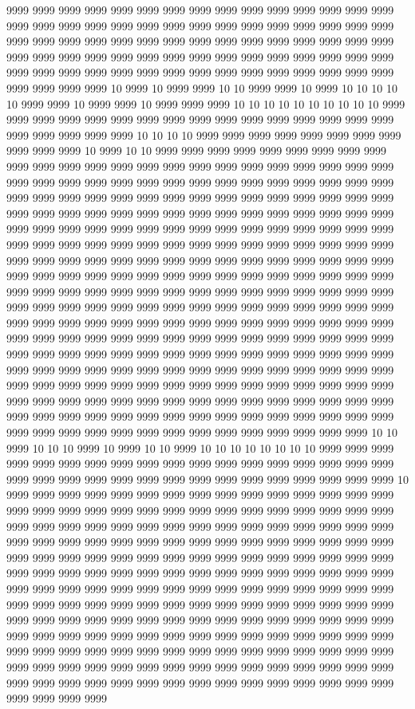 9999 9999 9999 9999 9999 9999 9999 9999 9999 9999 9999 9999 9999 9999 9999 9999 9999 9999 9999 9999 9999 9999 9999 9999 9999 9999 9999 9999 9999 9999 9999 9999 9999 9999 9999 9999 9999 9999 9999 9999 9999 9999 9999 9999 9999 9999 9999 9999 9999 9999 9999 9999 9999 9999 9999 9999 9999 9999 9999 9999 9999 9999 9999 9999 9999 9999 9999 9999 9999 9999 9999 9999 9999 9999 9999 9999 9999 9999 9999 10 9999 10 9999 9999 10 10 9999 9999 10 9999 10 10 10 10 10 9999 9999 10 9999 9999 10 9999 9999 9999 10 10 10 10 10 10 10 10 10 10 9999 9999 9999 9999 9999 9999 9999 9999 9999 9999 9999 9999 9999 9999 9999 9999 9999 9999 9999 9999 9999 10 10 10 10 9999 9999 9999 9999 9999 9999 9999 9999 9999 9999 9999 10 9999 10 10 9999 9999 9999 9999 9999 9999 9999 9999 9999 9999 9999 9999 9999 9999 9999 9999 9999 9999 9999 9999 9999 9999 9999 9999 9999 9999 9999 9999 9999 9999 9999 9999 9999 9999 9999 9999 9999 9999 9999 9999 9999 9999 9999 9999 9999 9999 9999 9999 9999 9999 9999 9999 9999 9999 9999 9999 9999 9999 9999 9999 9999 9999 9999 9999 9999 9999 9999 9999 9999 9999 9999 9999 9999 9999 9999 9999 9999 9999 9999 9999 9999 9999 9999 9999 9999 9999 9999 9999 9999 9999 9999 9999 9999 9999 9999 9999 9999 9999 9999 9999 9999 9999 9999 9999 9999 9999 9999 9999 9999 9999 9999 9999 9999 9999 9999 9999 9999 9999 9999 9999 9999 9999 9999 9999 9999 9999 9999 9999 9999 9999 9999 9999 9999 9999 9999 9999 9999 9999 9999 9999 9999 9999 9999 9999 9999 9999 9999 9999 9999 9999 9999 9999 9999 9999 9999 9999 9999 9999 9999 9999 9999 9999 9999 9999 9999 9999 9999 9999 9999 9999 9999 9999 9999 9999 9999 9999 9999 9999 9999 9999 9999 9999 9999 9999 9999 9999 9999 9999 9999 9999 9999 9999 9999 9999 9999 9999 9999 9999 9999 9999 9999 9999 9999 9999 9999 9999 9999 9999 9999 9999 9999 9999 9999 9999 9999 9999 9999 9999 9999 9999 9999 9999 9999 9999 9999 9999 9999 9999 9999 9999 9999 9999 9999 9999 9999 9999 9999 9999 9999 9999 9999 9999 9999 9999 9999 9999 9999 9999 9999 9999 9999 9999 9999 9999 9999 9999 9999 9999 9999 9999 9999 9999 9999 9999 9999 9999 9999 9999 9999 9999 9999 9999 9999 9999 9999 9999 9999 9999 10 10 9999 10 10 10 9999 10 9999 10 10 9999 10 10 10 10 10 10 10 10 9999 9999 9999 9999 9999 9999 9999 9999 9999 9999 9999 9999 9999 9999 9999 9999 9999 9999 9999 9999 9999 9999 9999 9999 9999 9999 9999 9999 9999 9999 9999 9999 9999 10 9999 9999 9999 9999 9999 9999 9999 9999 9999 9999 9999 9999 9999 9999 9999 9999 9999 9999 9999 9999 9999 9999 9999 9999 9999 9999 9999 9999 9999 9999 9999 9999 9999 9999 9999 9999 9999 9999 9999 9999 9999 9999 9999 9999 9999 9999 9999 9999 9999 9999 9999 9999 9999 9999 9999 9999 9999 9999 9999 9999 9999 9999 9999 9999 9999 9999 9999 9999 9999 9999 9999 9999 9999 9999 9999 9999 9999 9999 9999 9999 9999 9999 9999 9999 9999 9999 9999 9999 9999 9999 9999 9999 9999 9999 9999 9999 9999 9999 9999 9999 9999 9999 9999 9999 9999 9999 9999 9999 9999 9999 9999 9999 9999 9999 9999 9999 9999 9999 9999 9999 9999 9999 9999 9999 9999 9999 9999 9999 9999 9999 9999 9999 9999 9999 9999 9999 9999 9999 9999 9999 9999 9999 9999 9999 9999 9999 9999 9999 9999 9999 9999 9999 9999 9999 9999 9999 9999 9999 9999 9999 9999 9999 9999 9999 9999 9999 9999 9999 9999 9999 9999 9999 9999 9999 9999 9999 9999 9999 9999 9999 9999 9999 9999 9999 9999 9999 9999 9999 9999 9999 9999 9999 9999 9999 9999 9999 9999 9999 9999 